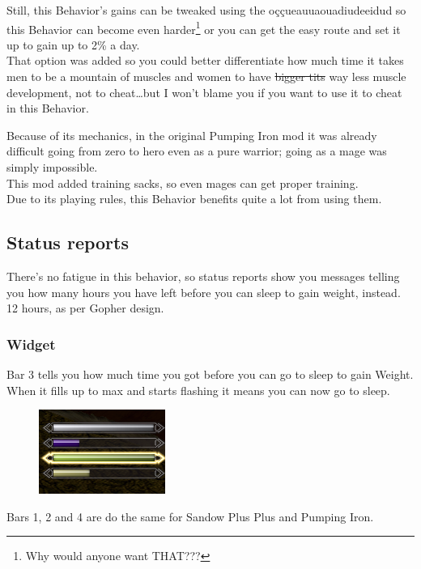 \documentclass[11pt]{article}
\newcommand{\w}{Weight}
\newcommand{\B}{Behavior}
\newcommand{\PI}{Pumping Iron}
\newcommand{\SPP}{Sandow Plus Plus}
\newlength{\imgMed}
\begin{document}
Still, this \B's gains can be tweaked using the oççueauuaouadiudeeidud so this \B{} can become even harder\footnote{Why would anyone want THAT???} or you can get the easy route and set it up to gain up to 2\% a day.\\
That option was added so you could better differentiate how much time it takes men to be a mountain of muscles and women to have \sout{bigger tits} way less muscle development, not to cheat\ldots but I won't blame you if you want to use it to cheat in this \B.

Because of its mechanics, in the original \PI{} mod it was already difficult going from zero to hero even as a pure warrior; going as a mage was simply impossible.\\
This mod added training sacks, so even mages can get proper training. \\
Due to its playing rules, this \B{} benefits quite a lot from using them.

\subsection{Status reports}
There's no fatigue in this behavior, so status reports show you messages telling you how many hours you have left before you can sleep to gain weight, instead.\\
12 hours, as per Gopher design.

\subsubsection{Widget}
Bar 3 tells you how much time you got before you can go to sleep to gain \w.\\
When it fills up to max and starts flashing it means you can now go to sleep.

\begin{figure}[H]
    \centering
    \includegraphics[width=\imgMed]{widget-PI-sleep}
    \label{fig:widget-PI-sleep}
\end{figure}

Bars 1, 2 and 4 are do the same for \SPP{} and \PI{}. 

\end{document}
